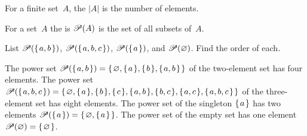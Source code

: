 \documentclass{ibl}
\begin{document}
\begin{df}
For a finite set~$A$, the  $|A|$ is the number of elements.
\end{df}


\begin{df}
For a set~$A$ the  is $\powerset(A)$ is the set of all
subsets of~$A$.
\end{df}

\begin{ex} List 
  $\powerset(\set{a,b})$,   
  $\powerset(\set{a,b,c})$,   
  $\powerset(\set{a})$, and   
  $\powerset(\emptyset)$.
  Find the order of each.   
\begin{ans}
The power set
$\powerset(\set{a,b})=\set{\emptyset, \set{a}, \set{b}, \set{a,b}}$
of the two-element set has four elements.
The power set 
$\powerset(\set{a,b,c})=\set{\emptyset,\set{a},\set{b},\set{c},
                             \set{a,b},\set{b,c},\set{a,c},\set{a,b,c}}$
of the three-element set has eight elements.
The power set of the singleton $\set{a}$ has two elements
$\powerset(\set{a})=\set{\emptyset,\set{a}}$.
The power set of the empty set has one element
$\powerset(\emptyset)=\set{\emptyset}$.   
\end{ans}
\end{ex}
\end{document}
